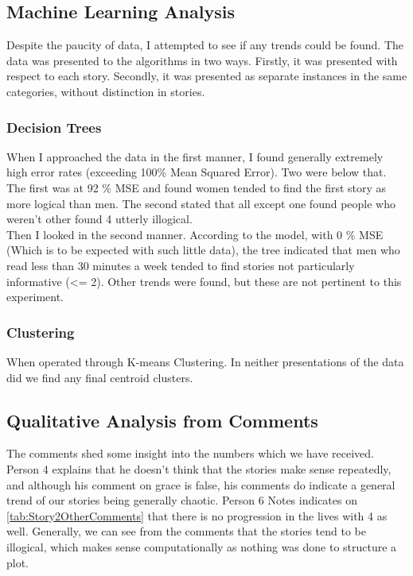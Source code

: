 \documentclass[12pt]{article}
\begin{document}
\subsection{Machine Learning Analysis}
Despite the paucity of data, I attempted to see if any trends could be found. The data was presented to the algorithms in two ways. Firstly, it was presented with respect to each story. Secondly, it was presented as separate instances in the same categories, without distinction in stories.\\
\subsubsection{Decision Trees}
When I approached the data in the first manner, I found generally extremely high error rates (exceeding 100\% Mean Squared Error). Two were below that. The first was at 92 \% MSE and found women tended to find the first story as more logical than men. The second stated that all except one found people who weren't other found 4 utterly illogical.\\
Then I looked in the second manner. According to the model, with 0 \% MSE (Which is to be expected with such little data), the tree indicated that men who read less than 30 minutes a week tended to find stories not particularly informative (<= 2). Other trends were found, but these are not pertinent to this experiment.  \\
\subsubsection{Clustering}
When operated through K-means Clustering. In neither presentations of the data did we find any final centroid clusters.\\
\subsection{Qualitative Analysis from Comments}
The comments shed some insight into the numbers which we have received. Person 4 explains that he doesn't think that the stories make sense repeatedly, and although his comment on grace is false, his comments do indicate a general trend of our stories being generally chaotic. Person 6 Notes indicates on \ref{tab:Story2OtherComments} that there is no progression in the lives with 4 as well. Generally, we can see from the comments that the stories tend to be illogical, which makes sense computationally as nothing was done to structure a plot. \\
\end{document}

